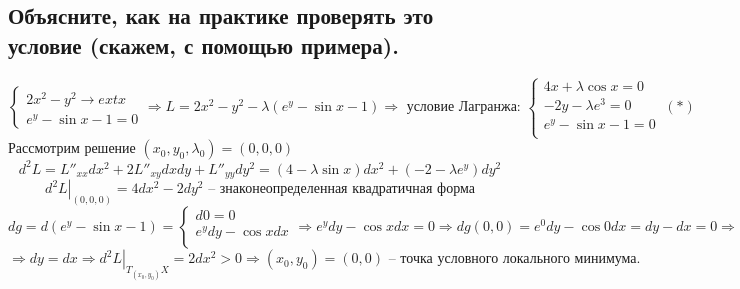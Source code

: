 \subsection{Объясните, как на практике проверять это условие (скажем, с помощью примера).}
\[
    \begin{cases}
        2x^2 - y^2 \to extx \\
        e^{y} - \sin x - 1 = 0
    \end{cases}
    \Rightarrow
    L = 2x^2 - y^2 - \lambda (e^y - \sin x - 1)
    \Rightarrow
    \text{ условие Лагранжа: }
    \begin{cases}
        4x + \lambda \cos x = 0 \\
        -2y - \lambda e^3 = 0 \\
        e^y - \sin x - 1 = 0 \\
    \end{cases}
    \> (*)
\]
Рассмотрим решение $(x_0, y_0, \lambda_0) = (0,0,0)$
\[
    d^2 L = L''_{xx} dx^2 + 2 L''_{xy} dx dy + L''_{yy} dy^2 = (4 - \lambda \sin x) dx^2 + (-2 - \lambda e^y) dy^2
\]
\[
    \left.
        d^2 L
    \right|_{(0,0,0)} = 4dx^2 - 2dy^2
    \text{ -- знаконеопределенная квадратичная форма}
\]
\[
    dg = d(e^y - \sin x - 1) = \begin{cases}
        d0 = 0 \\
        e^y dy - \cos x dx \\
    \end{cases}
    \Rightarrow
    e^y dy - \cos x dx = 0
    \Rightarrow
    dg(0, 0) = e^0dy - \cos 0 dx = dy - dx = 0
    \Rightarrow
\]
\[
    \Rightarrow
    dy = dx
    \Rightarrow
    \left.
        d^2 L
    \right|_{T_{(x_0, y_0)} X} = 2dx^2 > 0
    \Rightarrow
    (x_0, y_0) = (0, 0)
    \text{ -- точка условного локального минимума.}
\]